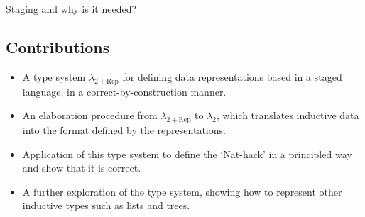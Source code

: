 Staging and why is it needed?

\subsection{Contributions}

\begin{itemize}
  \item A type system $\lambda_{2+\text{Rep}}$ for defining data representations based
        in a staged language, in a correct-by-construction manner.
  \item An elaboration procedure from $\lambda_{2+\text{Rep}}$ to $\lambda_2$, which
        translates inductive data into the format defined by the representations.
  \item Application of this type system to define the `Nat-hack' in a principled way
        and show that it is correct.
  \item A further exploration of the type system, showing how to represent other
        inductive types such as lists and trees.
\end{itemize}
